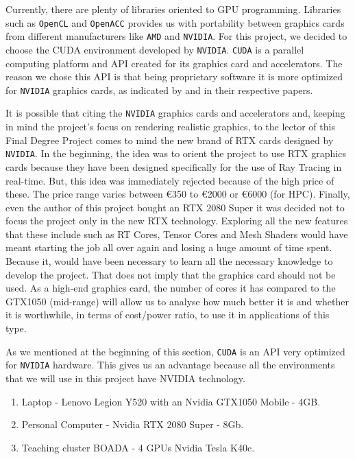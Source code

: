 \documentclass[titlepage,12pt]{report}
\begin{document}
Currently, there are plenty of libraries oriented to GPU programming. Libraries such as \texttt{OpenCL} and \texttt{OpenACC} provides us with portability between graphics cards from different manufacturers like \texttt{AMD} and \texttt{NVIDIA}. For this project, we decided to choose the CUDA environment developed by \texttt{NVIDIA}. \texttt{CUDA} is a parallel computing platform and API created for its graphics card and accelerators. The reason we chose this API is that being proprietary software it is more optimized for \texttt{NVIDIA} graphics cards, as indicated by \citep{Karimi2010} and \citep[pp.~216--215]{Fang2011} in their respective papers.

It is possible that citing the \texttt{NVIDIA} graphics cards and accelerators and, keeping in mind the project's focus on rendering realistic graphics, to the lector of this Final Degree Project comes to mind the new brand of RTX cards designed by \texttt{NVIDIA}. In the beginning, the idea was to orient the project to use RTX graphics cards because they have been designed specifically for the use of Ray Tracing in real-time. But, this idea was immediately rejected because of the high price of these. The price range varies between €350 to €2000 or €6000 (for HPC). Finally, even the author of this project bought an RTX 2080 Super it was decided not to focus the project only in the new RTX technology. Exploring all the new features that these include such as RT Cores, Tensor Cores and Mesh Shaders would have meant starting the job all over again and losing a huge amount of time spent. Because it, would have been necessary to learn all the necessary knowledge to develop the project. That does not imply that the graphics card should not be used. As a high-end graphics card, the number of cores it has compared to the GTX1050 (mid-range) will allow us to analyse how much better it is and whether it is worthwhile, in terms of cost/power ratio, to use it in applications of this type.

As we mentioned at the beginning of this section,  \texttt{CUDA} is an API very optimized for \texttt{NVIDIA} hardware. This gives us an advantage because all the environments that we will use in this project have NVIDIA technology.

\begin{enumerate}
	\item Laptop - Lenovo Legion Y520 with an Nvidia GTX1050 Mobile - 4GB.
	\item Personal Computer - Nvidia RTX 2080 Super - 8Gb.
	\item Teaching cluster BOADA - 4 GPUs Nvidia Tesla K40c.
\end{enumerate}
\end{document}
